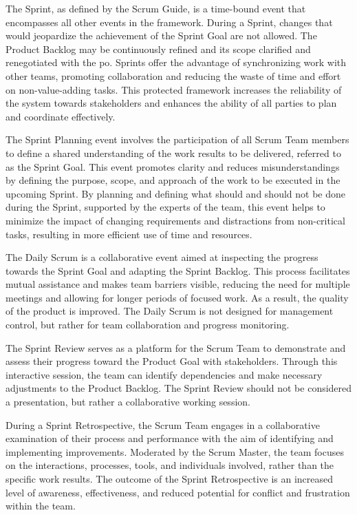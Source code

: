 \begin{description}[style=nextline]
    \item[Sprint]
    The Sprint, as defined by the Scrum Guide, is a time-bound event that encompasses all other events in the \gls{framework}. During a Sprint, changes that would jeopardize the achievement of the Sprint Goal are not allowed. The Product Backlog may be continuously refined and its scope clarified and renegotiated with the \ac{po}. Sprints offer the advantage of synchronizing work with other teams, promoting collaboration and reducing the waste of time and effort on non-value-adding tasks. This protected \gls{framework} increases the reliability of the system towards stakeholders and enhances the ability of all parties to plan and coordinate effectively.~\cite[pp.~7--8]{Schwaber2020Tsg}
    \item[Sprint Planning]
    The Sprint Planning event involves the participation of all Scrum Team members to define a shared understanding of the work results to be delivered, referred to as the Sprint Goal. This event promotes clarity and reduces misunderstandings by defining the purpose, scope, and approach of the work to be executed in the upcoming Sprint. By planning and defining what should and should not be done during the Sprint, supported by the experts of the team, this event helps to minimize the impact of changing requirements and distractions from non-critical tasks, resulting in more efficient use of time and resources.~\cite[p.~8]{Schwaber2020Tsg}
    \item[Daily Scrum]
    The Daily Scrum is a collaborative event aimed at inspecting the progress towards the Sprint Goal and adapting the Sprint Backlog. This process facilitates mutual assistance and makes team barriers visible, reducing the need for multiple meetings and allowing for longer periods of focused work. As a result, the quality of the product is improved. The Daily Scrum is not designed for management control, but rather for team collaboration and progress monitoring.~\cite[p.~9]{Schwaber2020Tsg}
    \item[Sprint Review]  
    The Sprint Review serves as a platform for the Scrum Team to demonstrate and assess their progress toward the Product Goal with stakeholders. Through this interactive session, the team can identify dependencies and make necessary adjustments to the Product Backlog. The Sprint Review should not be considered a presentation, but rather a collaborative working session.~\cite[p.~9]{Schwaber2020Tsg}
    \item[Sprint Retrospective] 
    During a Sprint Retrospective, the Scrum Team engages in a collaborative examination of their process and performance with the aim of identifying and implementing improvements. Moderated by the Scrum Master, the team focuses on the interactions, processes, tools, and individuals involved, rather than the specific work results. The outcome of the Sprint Retrospective is an increased level of awareness, effectiveness, and reduced potential for conflict and frustration within the team.~\cite[p.~10]{Schwaber2020Tsg}
\end{description}

